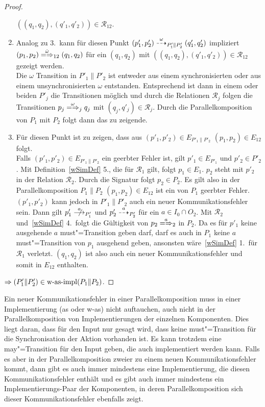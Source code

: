 \begin{proof}
\begin{enumerate}
      $((q_1,q_2),(q'_1,q'_2))\in\mathcal{R}_{12}$.
    \item Analog zu 3.\ kann für diesen Punkt
      $(p'_1,p'_2)\may[\omega]_{P'_1\|P'_2}(q'_1,q'_2)$ impliziert $(p_1,p_2)
      \weakmay[\hat{\omega}]_{12} (q_1,q_2)$ für ein $(q_1,q_2)$ mit
      $((q_1,q_2),(q'_1,q'_2))\in\mathcal{R}_{12}$ gezeigt werden.\\
      Die $\omega$ Transition in $P'_1\|P'_2$ ist entweder aus einem
      synchronisierten oder aus einem unsynchronisierten $\omega$ entstanden.
      Entsprechend ist dann in einem oder beiden $P'_j$ die Transitionen
      möglich und durch die Relationen $\mathcal{R}_j$ folgen die Transitionen
      $p_j \weakmay[\omega]_j q_j$ mit $(q_j,q'_j)\in\mathcal{R}_j$. Durch
      die Parallelkomposition von $P_1$ mit $P_2$ folgt dann das zu zeigende.
    \item Für diesen Punkt ist zu zeigen, dass aus $(p'_1,p'_2)\in
      E_{P'_1\|P'_2}$ $(p_1,p_2)\in E_{12}$ folgt.\\
      Falls $(p'_1,p'_2)\in E_{P'_1\|P'_2}$ ein geerbter Fehler ist, gilt
      \oBdA{} $p'_1\in E_{P'_1}$ und $p'_2\in P'_2$. Mit
      Definition~\ref{wSimDef} 5., die für $\mathcal{R}_1$ gilt, folgt $p_1\in
      E_1$. $p_2$ steht mit $p'_2$ in der Relation $\mathcal{R}_2$. Durch die
      Signatur folgt $p_2\in P_2$. Es gilt also in der Parallelkomposition
      $P_1\|P_2$ $(p_1,p_2)\in E_{12}$ ist ein von $P_1$ geerbter Fehler.
      $(p'_1,p'_2)$ kann jedoch in $P'_1\|P'_2$ auch ein neuer
      Kommunikationsfehler sein. Dann gilt \oBdA{} $p'_1\nmust[a]_{P'_1}$ und
      $p'_2\may[a]_{P'_2}$ für ein $a\in I_0\cap O_2$. Mit $\mathcal{R}_2$
      und~\ref{wSimDef} 4.\ folgt die Gültigkeit von $p_2\weakmay[a]_2$ in
      $P_2$. Da es für $p'_1$ keine ausgehende $a$ must"=Transition geben darf,
      darf es auch in $P_1$ keine $a$ must"=Transition von $p_1$ ausgehend geben,
      ansonsten wäre~\ref{wSimDef} 1.\ für $\mathcal{R}_1$ verletzt.
      $(q_1,q_2)$ ist also auch ein neuer Kommunikationsfehler und somit in
      $E_{12}$ enthalten.
  \end{enumerate}
  $\Rightarrow (P'_1\|P'_2)\in\mathrm{w}\text{-}\mathrm{as}\text{-}\mathrm{impl} (P_1\|P_2)$.
\end{proof}

Ein neuer Kommunikationsfehler in einer Parallelkomposition muss in einer
Implementierung (as oder w-as) nicht auftauchen, auch nicht in der
Parallelkomposition von Implementierungen der einzelnen Komponenten. Dies liegt
daran, dass für den Input nur gesagt wird, dass keine must"=Transition für die
Synchronisation der Aktion vorhanden ist. Es kann trotzdem eine
may"=Transition für den Input geben, die auch implementiert werden kann.
Falls es aber in der Parallelkomposition zweier \MEIO{} zu einem neuen
Kommunikationsfehler kommt, dann gibt es auch immer mindestens eine
Implementierung, die diesen Kommunikationsfehler enthält und es gibt auch immer
mindestens ein Implementierungs-Paar der Komponenten, in deren
Parallelkomposition sich dieser Kommunikationsfehler ebenfalls zeigt.
